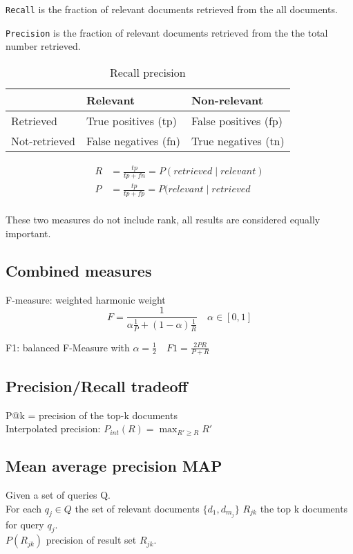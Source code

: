 \texttt{Recall} is the fraction of relevant documents retrieved from
the all documents.

\texttt{Precision} is the fraction of relevant documents retrieved
from the the total number retrieved.

\begin{table}[!htp]
  \centering
  \label{precision-recall-table}
  \begin{tabular}{|l|l|l|}
    \hline
    & Relevant             & Non-relevant         \\ \hline
    Retrieved     & True positives (tp)  & False positives (fp) \\ \hline
    Not-retrieved & False negatives (fn) & True negatives (tn) \\ \hline
  \end{tabular}
  \caption{Recall precision}
\end{table}

\begin{align*}
  R &= \frac{tp}{tp + fn} = P(retrieved \mid relevant)  \\
  P &= \frac{tp}{tp + fp} = P(relevant \mid retrieved  \\
\end{align*}

These two measures do not include rank, all results are considered equally important.

\subsection{Combined measures}

F-measure: weighted harmonic weight
$$
F = \frac{1}{\alpha \frac{1}{P} + (1 - \alpha) \frac{1}{R}} \quad \alpha \in [0, 1]
$$

F1: balanced F-Measure with $ \alpha = \frac{1}{2} \quad F1 = \frac{2 PR}{P + R} $

\subsection{Precision/Recall tradeoff}

P@k = precision of the top-k documents \\
Interpolated precision: $ P_{int} (R) = \max_{R' \geq R}{R'} $

\subsection{Mean average precision MAP}
Given a set of queries Q. \\
For each $ q_j \in Q $ the set of relevant documents $ \{ d_1, d_{m_j} \} $
$ R_{jk} $ the top k documents for query  $ q_j $. \\
$ P(R_{jk}) $ precision of result set $ R_{jk} $. \\

